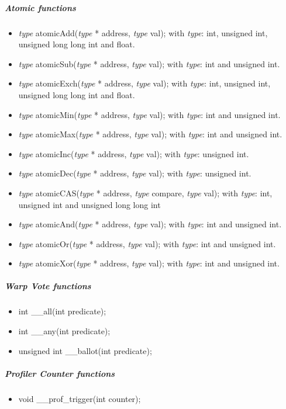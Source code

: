 					\subparagraph{Atomic functions}

\begin{itemize}
	\item \emph{type} atomicAdd(\emph{type} * address, \emph{type} val); with \emph{type}: int, unsigned int, unsigned long long int and float.
	\item \emph{type} atomicSub(\emph{type} * address, \emph{type} val); with \emph{type}: int and unsigned int.
	\item \emph{type} atomicExch(\emph{type} * address, \emph{type} val); with \emph{type}: int, unsigned int, unsigned long long int and float.
	\item \emph{type} atomicMin(\emph{type} * address, \emph{type} val); with \emph{type}: int and unsigned int.
	\item \emph{type} atomicMax(\emph{type} * address, \emph{type} val); with \emph{type}: int and unsigned int.
	\item \emph{type} atomicInc(\emph{type} * address, \emph{type} val); with \emph{type}: unsigned int.
	\item \emph{type} atomicDec(\emph{type} * address, \emph{type} val); with \emph{type}: unsigned int.
	\item \emph{type} atomicCAS(\emph{type} * address, \emph{type} compare, \emph{type} val); with \emph{type}: int, unsigned int and unsigned long long int
	\item \emph{type} atomicAnd(\emph{type} * address, \emph{type} val); with \emph{type}: int and unsigned int.
	\item \emph{type} atomicOr(\emph{type} * address, \emph{type} val); with \emph{type}: int and unsigned int.
	\item \emph{type} atomicXor(\emph{type} * address, \emph{type} val); with \emph{type}: int and unsigned int.
\end{itemize}

					\subparagraph{Warp Vote functions}

\begin{itemize}
	\item int \_\_all(int predicate);
	\item int \_\_any(int predicate);
	\item unsigned int \_\_ballot(int predicate);
\end{itemize}

					\subparagraph{Profiler Counter functions}

\begin{itemize}
	\item void \_\_prof\_trigger(int counter);
\end{itemize}

